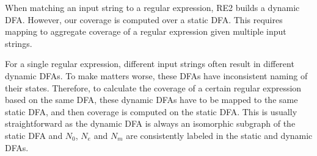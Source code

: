





When matching an input string to a regular expression, RE2 builds a dynamic DFA. However, our coverage is computed over a static DFA. This requires mapping to aggregate coverage of a regular expression given multiple input strings. 

For a single regular expression, different input strings often result in different dynamic DFAs. To make matters worse,  these DFAs have inconsistent naming of their states. 
Therefore, to calculate the coverage of a certain regular expression based on the same DFA, these dynamic DFAs have to be mapped to the same static DFA, and then coverage is computed on the static DFA. This is usually straightforward as the dynamic DFA is always an isomorphic subgraph of the static DFA and $N_0$, $N_e$ and $N_m$ are consistently labeled in the static and dynamic DFAs. 


